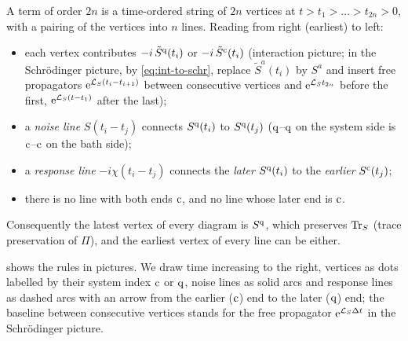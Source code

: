 \begin{keybox}
A term of order $2n$ is a time-ordered string of $2n$ vertices at $t>t_1>\dots>t_{2n}>0$, with a pairing of the vertices into $n$ lines.
Reading from right (earliest) to left:
\begin{itemize}[itemsep=1pt]
\item each vertex contributes $-i\,\tilde S^{\mathrm{q}}(t_i)$ or $-i\,\tilde S^{\mathrm{c}}(t_i)$ (interaction picture; in the Schr\"odinger picture, by \cref{eq:int-to-schr}, replace $\tilde S^a(t_i)$ by $S^a$ and insert free propagators $\mathrm{e}^{\mathcal{L}_S(t_i-t_{i+1})}$ between consecutive vertices and $\mathrm{e}^{\mathcal{L}_St_{2n}}$ before the first, $\mathrm{e}^{\mathcal{L}_S(t-t_1)}$ after the last);
\item a \emph{noise line} $S(t_i-t_j)$ connects $S^{\mathrm{q}}(t_i)$ to $S^{\mathrm{q}}(t_j)$ ($\mathrm{q}$--$\mathrm{q}$ on the system side is $\mathrm{c}$--$\mathrm{c}$ on the bath side);
\item a \emph{response line} $-i\chi(t_i-t_j)$ connects the \emph{later} $S^{\mathrm{q}}(t_i)$ to the \emph{earlier} $S^{\mathrm{c}}(t_j)$;
\item there is no line with both ends $\mathrm{c}$, and no line whose later end is $\mathrm{c}$.
\end{itemize}
Consequently the latest vertex of every diagram is $S^{\mathrm{q}}$, which preserves $\operatorname{Tr}_S$ (trace preservation of $\Pi$), and the earliest vertex of every line can be either.
\end{keybox}

 shows the rules in pictures.
We draw time increasing to the right, vertices as dots labelled by their system index $\mathrm{c}$ or $\mathrm{q}$, noise lines as solid arcs and response lines as dashed arcs with an arrow from the earlier ($\mathrm{c}$) end to the later ($\mathrm{q}$) end; the baseline between consecutive vertices stands for the free propagator $\mathrm{e}^{\mathcal{L}_S\Delta t}$ in the Schr\"odinger picture.

